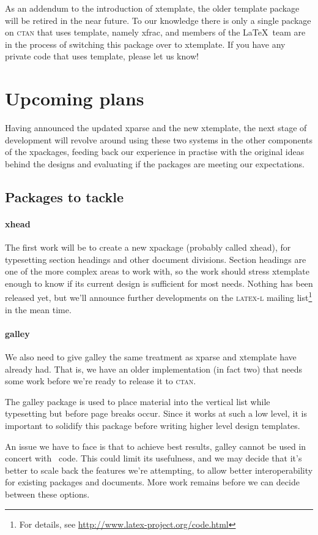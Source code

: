 \documentclass{ltnews}
\begin{document}
As an addendum to the introduction of \textsf{xtemplate}, the older \textsf{template} package will be retired in the near future. To our knowledge there is only a single package on \textsc{ctan} that uses \textsf{template}, namely \textsf{xfrac}, and members of the \LaTeX\ team are in the process of switching this package over to \textsf{xtemplate}. If you have any private code that uses \textsf{template}, please let us know!


\section{Upcoming plans}

Having announced the updated \textsf{xparse} and the new \textsf{xtemplate}, the next stage of development will revolve around using these two systems in the other components of the \textsf{xpackages}, feeding back our experience in practise with the original ideas behind the designs and evaluating if the packages are meeting our expectations.

\subsection{Packages to tackle}

\paragraph{\textsf{xhead}}
The first work will be to create a new \textsf{xpackage} (probably called \textsf{xhead}), for typesetting section headings and other document divisions.
Section headings are one of the more complex areas to work with, so
the work should stress \textsf{xtemplate} enough to know if its
current design is sufficient for most needs.  Nothing has been
released yet, but we'll announce further developments on the
\textsc{latex-l} mailing
list\footnote{For details, see
  \url{http://www.latex-project.org/code.html}} in the 
mean time.


\paragraph{\textsf{galley}}
We also need to give \textsf{galley} the same treatment as
\textsf{xparse} and \textsf{xtemplate} have already had. That is, we have an
older implementation (in fact two) that needs some work before we're ready to release it to \textsc{ctan}.

The \textsf{galley} package is used to place material into the
vertical list while typesetting but before page breaks occur. Since it
works at such a low level, it is important to solidify this package
before writing higher level design templates.

An issue we have to face is that to achieve best results,
\textsf{galley} cannot be used in concert with \LaTeXe\ code.  This
could limit its usefulness, and we may decide that it's better to
scale back the features we're attempting, to allow better
interoperability for existing packages and documents.  More work
remains before we can decide between these options.
\end{document}
